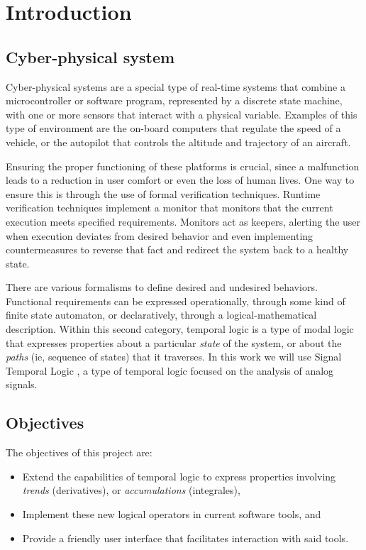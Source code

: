 \chapter{Introduction}

\section{Cyber-physical system}
Cyber-physical systems are a special type of real-time systems that combine a microcontroller or software program, represented by a discrete state machine, with one or more sensors that interact with a physical variable. Examples of this type of environment are the on-board computers that regulate the speed of a vehicle, or the autopilot that controls the altitude and trajectory of an aircraft.

Ensuring the proper functioning of these platforms is crucial, since a malfunction leads to a reduction in user comfort or even the loss of human lives. One way to ensure this is through the use of formal verification techniques. Runtime verification techniques \cite{STTT_RV_21} implement a monitor that monitors that the current execution meets specified requirements. Monitors act as keepers, alerting the user when execution deviates from desired behavior and even implementing countermeasures to reverse that fact and redirect the system back to a healthy state.

There are various formalisms to define desired and undesired behaviors. Functional requirements can be expressed operationally, through some kind of finite state automaton, or declaratively, through a logical-mathematical description. Within this second category, temporal logic is a type of modal logic that expresses properties about a particular \emph{state} of the system, or about the \emph{paths} (ie, sequence of states) that it traverses. In this work we will use Signal Temporal Logic \cite{STL}, a type of temporal logic focused on the analysis of analog signals.

\section{Objectives}

The objectives of this project are:

\begin{itemize}
\item Extend the capabilities of temporal logic to express properties involving \textit{trends} (derivatives), or \textit{accumulations} (integrales), 
\item Implement these new logical operators in current software tools, and
\item Provide a friendly user interface that facilitates interaction with said tools.
\end{itemize}

